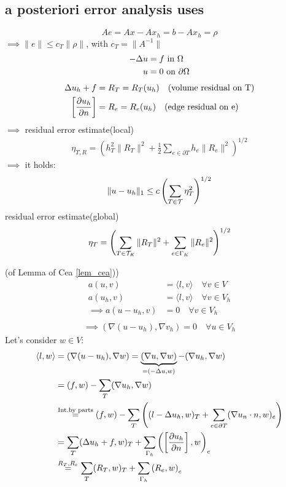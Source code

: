 \subsection{a posteriori error analysis uses}
\begin{equation*}
	Ae = Ax-Ax_h = b - Ax_h = \rho
\end{equation*}
$\implies \|e\| \leq c_T \|\rho\|$, with $c_T = \|A^{-1}\|$
\begin{align*}
	-\Delta u &= f \text{ in } \Omega \\
	u &= 0 \text{ on } \partial \Omega
\end{align*}
\begin{align*}
	\Delta u_h +f &= R_T= R_T(u_h) \quad (\text{volume residual on T}) \\
	\left[\frac{\partial u_h}{\partial n}\right] &= R_e= R_e(u_h) \quad (\text{edge residual on e}) \\
\end{align*}
$\implies$ residual error estimate(local)
\begin{align*}
	\eta_{T,R} = \left( h_T^2 \|R_T\|^2  + \frac{1}{2}\displaystyle \sum_{e\in \partial T}  h_e \|R_e\|^2\right)^{1/2}
\end{align*}
$\implies$ it holds:
\begin{align}\label{lem_cea}
	\|u-u_h\|_1 \leq c \left( \sum \limits_{T \in \mathcal{T}} \eta_T^2 \right)^{1/2}
\end{align}
residual error estimate(global)
\begin{equation*}
	\eta_T = \left(  \sum \limits_{T \in \mathcal{T}_K} \|R_T\|^2  +  \sum \limits_{e \in \Gamma_K} \|R_e\|^2 \right)^{1/2}
\end{equation*}
\begin{proof_}
	(of Lemma of Cea \eqref{lem_cea}))
	\begin{align*}
		a(u,v) &= \langle l,v\rangle\quad \forall v\in V \\
		a(u_h,v) &=\langle l,v\rangle \quad \forall v\in V_h \\
		\implies a(u-u_h,v) &=0 \quad \forall v\in V_h \\
	\end{align*}
	\begin{align}
		\implies ( \nabla(u-u_h),\nabla v_h )  =0 \quad \forall u \in V_h 
	\end{align} 
	Let's consider $w \in V$:
	\begin{align*}
		\langle l,w\rangle &= (\nabla(u-u_h),\nabla w) =\underbrace{(\nabla u,\nabla w)}_{=(-\Delta u,w) } - (\nabla u_h,\nabla w) \\
		&= (f,w) - \sum\limits_T (\nabla u_h,\nabla w)\\
		&\stackrel{\text{Int.by parts}}{=} (f,w) - \sum \limits_T \left( (l-\Delta u_h,w)_T + \sum \limits_{e\in\partial T} (\nabla u_n \cdot n,w)_e \right)\\
		&= \sum \limits_T  (\Delta u_h +f,w)_T + \sum \limits_{\Gamma_h} \left(\left[\frac{\partial u_h}{\partial n}\right],w\right)_e \\
		&\stackrel{R_T,R_e}{=} \sum \limits_T  (R_T,w)_T + \sum \limits_{\Gamma_h} \left(R_e,w\right)_e
	\end{align*}
\end{proof_}

